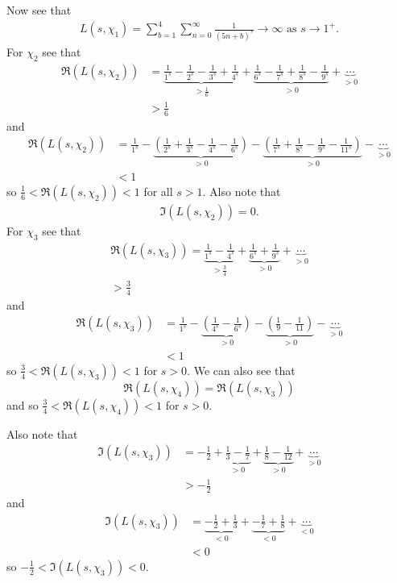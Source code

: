 \documentclass{unswmaths}
\begin{document}
Now see that 
\begin{align*}
	L(s,\chi_1) = \sum_{b = 1}^4 \sum_{n=0}^\infty \frac{1}{(5n+b)^s} \longrightarrow \infty \text{ as } s \longrightarrow 1^+.
\end{align*}
For $ \chi_2 $ see that 
\begin{align*}
	\Re(L(s, \chi_2)) &= \underbrace{\frac{1}{1^s} - \frac{1}{2^s} -\frac{1}{3^s} + \frac{1}{4^s}}_{>\frac{1}{6}} + \underbrace{\frac{1}{6^s} - \frac{1}{7^s} + \frac{1}{8^s} - \frac{1}{9^s}}_{> 0 } + \underbrace{\cdots}_{>0} \\
		&> \frac{1}{6}
\end{align*}
and 
\begin{align*}
	\Re(L(s, \chi_2)) &= \frac{1}{1^s} - \underbrace{\left( \frac{1}{2^s} +\frac{1}{3^s} - \frac{1}{4^s} - \frac{1}{6^s} \right)}_{>0} - 
		\underbrace{\left(\frac{1}{7^s} + \frac{1}{8^s} - \frac{1}{9^s} - \frac{1}{11^s} \right)}_{>0} - \underbrace{\cdots}_{>0} \\
		&< 1
\end{align*}
so $ \frac{1}{6} < \Re(L(s, \chi_2)) < 1 $ for all $ s > 1 $.
Also note that
\begin{align*}
	\Im( L(s, \chi_2)) = 0.
\end{align*}
For $ \chi_3 $ see that
\begin{align*}
	\Re(L(s, \chi_3)) = \underbrace{\frac{1}{1^s} - \frac{1}{4^s}}_{>\frac{3}{4}} + 
		\underbrace{\frac{1}{6^s} + \frac{1}{9^s}}_{>0} + \underbrace{\cdots}_{>0} \\
		> \frac{3}{4}
\end{align*}
and 
\begin{align*}
	\Re(L(s, \chi_3)) &= \frac{1}{1^s} - \underbrace{\left( \frac{1}{4^s} - \frac{1}{6^s} \right)}_{>0} - \underbrace{\left( \frac{1}{9} - \frac{1}{11} \right)}_{>0} - \underbrace{\cdots}_{>0} \\
		&< 1
\end{align*}
so $ \frac{3}{4} < \Re(L(s, \chi_3)) < 1 $ for $ s > 0 $. 
We can also see that $$ \Re(L(s, \chi_4)) = \Re(L(s, \chi_3)) $$ and so $ \frac{3}{4} < \Re(L(s, \chi_4)) < 1 $ for $ s > 0 $.

Also note that
\begin{align*}
	\Im(L(s, \chi_3)) &= -\frac{1}{2} + \underbrace{\frac{1}{3} - \frac{1}{7}}_{>0} + \underbrace{\frac{1}{8} - \frac{1}{12}}_{>0} + \underbrace{\cdots}_{>0} \\
		&> -\frac{1}{2}
\end{align*}
and
\begin{align*}
	\Im(L(s, \chi_3)) &= \underbrace{-\frac{1}{2} + \frac{1}{3}}_{<0} + \underbrace{- \frac{1}{7} + \frac{1}{8}}_{<0} + \underbrace{\cdots}_{<0} \\
		&< 0
\end{align*}
so $ -\frac{1}{2} < \Im(L(s, \chi_3)) < 0 $.
\end{document}

